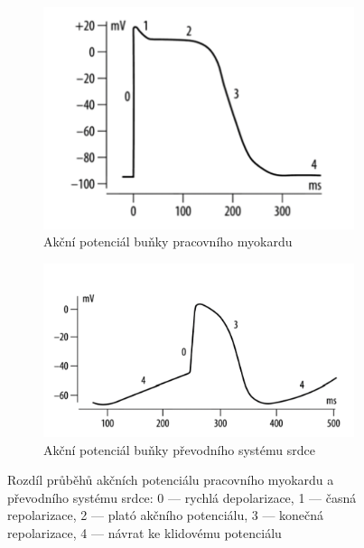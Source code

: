 \begin{figure}[h]
	\centering
	\begin{subfigure}{0.4\textwidth}
		\includegraphics[width=1\textwidth]{../assets/figures/myokard_ap}
		\caption{Akční potenciál buňky pracovního myokardu \cite{Petrek2019}}
		\label{fig:myokard_ap}
	\end{subfigure}
	\hfil
	\begin{subfigure}{0.5\textwidth}
		\includegraphics[width=1\textwidth]{../assets/figures/pss_ap}
		\caption{Akční potenciál buňky převodního systému srdce
			\cite{Petrek2019}}
		\label{fig:pss_ap}
	\end{subfigure}
	\caption{Rozdíl průběhů akčních potenciálu pracovního myokardu a převodního
		systému srdce: 0 --- rychlá depolarizace, 1 --- časná repolarizace, 2
		--- plató akčního potenciálu, 3 --- konečná repolarizace, 4 --- návrat
		ke klidovému potenciálu}
	\label{fig:ap}
\end{figure}

